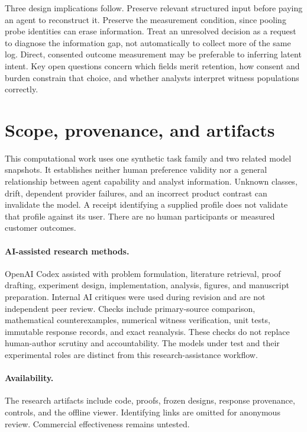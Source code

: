 \documentclass[sigconf,review,anonymous]{acmart}
\begin{document}
Three design implications follow. Preserve relevant structured input before paying an agent to reconstruct it. Preserve the measurement condition, since pooling probe identities can erase information. Treat an unresolved decision as a request to diagnose the information gap, not automatically to collect more of the same log. Direct, consented outcome measurement may be preferable to inferring latent intent. Key open questions concern which fields merit retention, how consent and burden constrain that choice, and whether analysts interpret witness populations correctly.

\section{Scope, provenance, and artifacts}
This computational work uses one synthetic task family and two related model snapshots. It establishes neither human preference validity nor a general relationship between agent capability and analyst information. Unknown classes, drift, dependent provider failures, and an incorrect product contrast can invalidate the model. A receipt identifying a supplied profile does not validate that profile against its user. There are no human participants or measured customer outcomes.

\paragraph{AI-assisted research methods.}
OpenAI Codex assisted with problem formulation, literature retrieval, proof drafting, experiment design, implementation, analysis, figures, and manuscript preparation. Internal AI critiques were used during revision and are not independent peer review. Checks include primary-source comparison, mathematical counterexamples, numerical witness verification, unit tests, immutable response records, and exact reanalysis. These checks do not replace human-author scrutiny and accountability. The models under test and their experimental roles are distinct from this research-assistance workflow.

\paragraph{Availability.}
The research artifacts include code, proofs, frozen designs, response provenance, controls, and the offline viewer. Identifying links are omitted for anonymous review. Commercial effectiveness remains untested.



\end{document}
